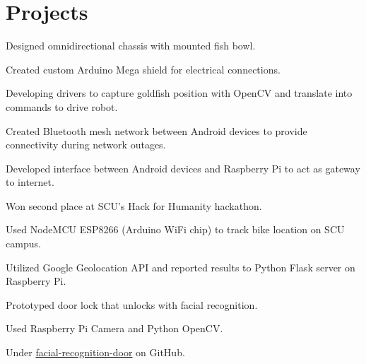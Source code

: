 \documentclass[]{deedy-resume-openfont}
\begin{document}
\begin{minipage}[t]{0.66\textwidth}

\section{Projects}
\begin{tightemize}
\item Designed omnidirectional chassis with mounted fish bowl. 
\item Created custom Arduino Mega shield for electrical connections.
\item Developing drivers to capture goldfish position with OpenCV and translate into commands to drive robot.
\end{tightemize}
\sectionsep

\begin{tightemize}
\item Created Bluetooth mesh network between Android devices to provide connectivity during network outages.
\item Developed interface between Android devices and Raspberry Pi to act as gateway to internet.
\item Won second place at SCU's Hack for Humanity hackathon.
\end{tightemize}
\sectionsep


\begin{tightemize}
\item Used NodeMCU ESP8266 (Arduino WiFi chip) to track bike location on SCU campus.
\item Utilized Google Geolocation API and reported results to Python Flask server on Raspberry Pi.
\end{tightemize}
\sectionsep

\begin{tightemize}
\item Prototyped door lock that unlocks with facial recognition. 
\item Used Raspberry Pi Camera and Python OpenCV.
\item Under {\href{https://github.com/zachbellay/facial-recognition-door}{facial-recognition-door}} on GitHub.
\end{tightemize}
\sectionsep




\end{minipage} 
\end{document}
